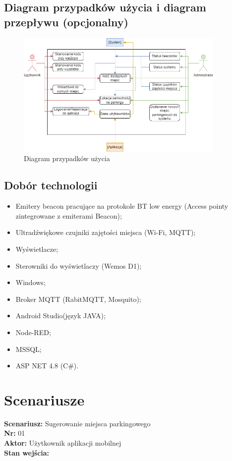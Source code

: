 \documentclass[12pt,a4paper]{article}
\begin{document}
\subsection{Diagram przypadków użycia i diagram przepływu (opcjonalny)}
\begin{figure}[htb!p]
\begin{center}
\includegraphics[width=0.9\textwidth]{Untitled_Diagram.drawio_1.png}
\caption{Diagram przypadków użycia}
\end{center}
\end{figure}

\subsection{Dobór technologii}
\begin{itemize}
\item Emitery beacon pracujące na protokole BT low energy (Access pointy zintegrowane z emiterami Beacon);
\item Ultradźwiękowe czujniki zajętości miejsca (Wi-Fi, MQTT);
\item Wyświetlacze;
\item Sterowniki do wyświetlaczy (Wemos D1);
\item Windows;
\item Broker MQTT (RabitMQTT, Mosquito);
\item Android Studio(język JAVA);
\item Node-RED;
\item MSSQL;
\item ASP NET 4.8  (C\#).
\end{itemize}



\newpage

\section{Scenariusze}
{\large \bf Scenariusz:} Sugerowanie miejsca parkingowego
\\{\bf Nr:} 01
\\{\bf Aktor:} Użytkownik aplikacji mobilnej
\\{\bf Stan wejścia:}
\end{document}
